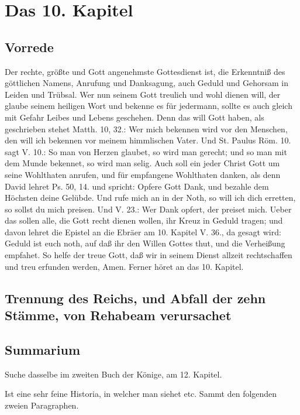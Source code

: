 \chapter{Das 10. Kapitel}

\section{Vorrede}

Der rechte, größte und Gott angenehmste Gottesdienst ist, die Erkenntniß des göttlichen Namens, Anrufung und Danksagung, auch Geduld und Gehorsam in Leiden und Trübsal. Wer nun seinem Gott treulich und wohl dienen will, der glaube seinem heiligen Wort und bekenne es für jedermann, sollte es auch gleich mit Gefahr Leibes und Lebens geschehen. Denn das will Gott haben, als geschrieben stehet Matth. 10, 32.: Wer mich bekennen wird vor den Menschen, den will ich bekennen vor meinem himmlischen Vater. Und St. Paulus Röm. 10. sagt V. 10.: So man von Herzen glaubet, so wird man gerecht; und so man mit dem Munde bekennet, so wird man selig. Auch soll ein jeder Christ Gott um seine Wohlthaten anrufen, und für empfangene Wohlthaten danken, als denn David lehret Ps. 50, 14. und spricht: Opfere Gott Dank, und bezahle dem Höchsten deine Gelübde. Und rufe mich an in der Noth, so will ich dich erretten, so sollst du mich preisen. Und V. 23.: Wer Dank opfert, der preiset mich. Ueber das sollen alle, die Gott recht dienen wollen, ihr Kreuz in Geduld tragen; und davon lehret die Epistel an die Ebräer am 10. Kapitel V. 36., da gesagt wird: Geduld ist euch noth, auf daß ihr den Willen Gottes thut, und die Verheißung empfahet. So helfe der treue Gott, daß wir in seinem Dienst allzeit rechtschaffen und treu erfunden werden, Amen. Ferner höret an das 10. Kapitel.

\section[Trennung des Reichs, und Abfall der zehn Stämme,]{Trennung des Reichs, und Abfall der zehn Stämme, von Rehabeam verursachet}

\section{Summarium}

Suche dasselbe im zweiten Buch der Könige, am 12. Kapitel.

Ist eine sehr feine Historia, in welcher man siehet etc. Sammt den folgenden zweien Paragraphen.

